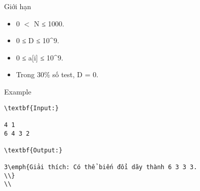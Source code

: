 Giới hạn
\begin{itemize}
	\item     0 $<$ N ≤ 1000.   
	\item     0 ≤ D ≤ 10^9.   
	\item     0 ≤ a[i] ≤ 10^9.   
	\item     Trong 30\% số test, D = 0.   
\end{itemize}
Example
\begin{verbatim}
\textbf{Input:}

4 1
6 4 3 2

\textbf{Output:}

3\emph{Giải thích: Có thể biến đổi dãy thành 6 3 3 3.
\\}
\\\end{verbatim}